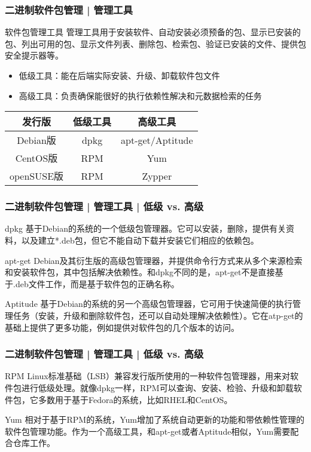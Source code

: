 \begin{frame}
  \frametitle{二进制软件包管理 | 管理工具}
  \begin{block}{软件包管理工具}
  管理工具用于安装软件、自动安装必须预备的包、显示已安装的包、列出可用的包、显示文件列表、删除包、检索包、验证已安装的文件、提供包安全提示器等。
  \begin{itemize}
    \item 低级工具：能在后端实际安装、升级、卸载软件包文件
    \item 高级工具：负责确保能很好的执行依赖性解决和元数据检索的任务
  \end{itemize}
  \end{block}
  \pause
  \begin{table}
    \centering
    \begin{tabularx}{0.658\textwidth}{ccc}
      \hline
      \rowcolor{blue!50}发行版 & 低级工具 & 高级工具\\
      \hline
      Debian版 & dpkg & apt-get/Aptitude\\
      CentOS版 & RPM & Yum\\
      openSUSE版 & RPM & Zypper\\
      \hline
    \end{tabularx}
  \end{table}
\end{frame}

\begin{frame}
  \frametitle{二进制软件包管理 | 管理工具 | 低级 vs. 高级}
  \begin{block}{dpkg}
    基于Debian的系统的一个低级包管理器。它可以安装，删除，提供有关资料，以及建立*.deb包，但它不能自动下载并安装它们相应的依赖包。
  \end{block}
  \pause
  \begin{block}{apt-get}
    Debian及其衍生版的高级包管理器，并提供命令行方式来从多个来源检索和安装软件包，其中包括解决依赖性。和dpkg不同的是，apt-get不是直接基于.deb文件工作，而是基于软件包的正确名称。
  \end{block}
  \pause
  \begin{block}{Aptitude}
    基于Debian的系统的另一个高级包管理器，它可用于快速简便的执行管理任务（安装，升级和删除软件包，还可以自动处理解决依赖性）。它在atp-get的基础上提供了更多功能，例如提供对软件包的几个版本的访问。
  \end{block}
\end{frame}

\begin{frame}
  \frametitle{二进制软件包管理 | 管理工具 | 低级 vs. 高级}
  \begin{block}{RPM}
    Linux标准基础（LSB）兼容发行版所使用的一种软件包管理器，用来对软件包进行低级处理。就像dpkg一样，RPM可以查询、安装、检验、升级和卸载软件包，它多数用于基于Fedora的系统，比如RHEL和CentOS。
  \end{block}
  \pause
  \begin{block}{Yum}
    相对于基于RPM的系统，Yum增加了系统自动更新的功能和带依赖性管理的软件包管理功能。作为一个高级工具，和apt-get或者Aptitude相似，Yum需要配合仓库工作。
  \end{block}
\end{frame}

